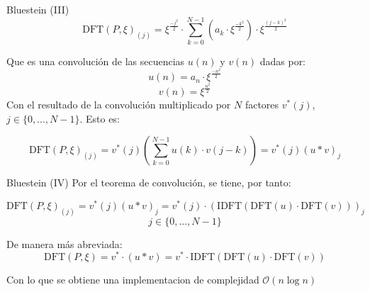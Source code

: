 \documentclass[spanish]{beamer}
\newcommand{\DFT}{\text{DFT}}
\newcommand{\IDFT}{\text{IDFT}}
\begin{document}
\begin{frame}{Bluestein (III)}
\begin{equation*}
      \DFT(P,\xi)_{(j)}= \xi ^{\frac{-j^2}{2}} \cdot \sum\limits_{k=0}^{N-1} (a_k \cdot\xi ^ {\frac{-k^2}{2}}) \cdot \xi^{ \frac{(j-k)^2}{2}}
\end{equation*}

Que es una convolución de las secuencias $u(n)$ y $v(n)$ dadas por:
\begin{equation*}
    u(n)= a_n \cdot\xi ^ {\frac{-n^2}{2}}
\end{equation*}
\begin{equation*}
    v(n) = \xi ^ { \frac{n^2}{2}}
\end{equation*}
Con el resultado de la convolución multiplicado por $N$ factores $v^{*}(j)$, $j\in\{0,...,N-1\}$. Esto es:

\begin{equation*}
      \DFT(P,\xi)_{(j)} =  v^{*}(j) \left(\sum\limits_{k=0}^{N-1} u(k) \cdot v(j-k)\right) =  v^{*}(j)(u * v)_j
\end{equation*}

\end{frame}
\begin{frame}{Bluestein (IV)}
    Por el teorema de convolución, se tiene, por tanto:
    
\begin{equation*}
    \DFT(P,\xi)_{(j)} =  v^{*}(j)(u * v)_j =   v^{*}(j) \cdot (\IDFT (\DFT(u) \cdot \DFT(v)))_j
\end{equation*}
\begin{equation*}
    j\in\{0,...,N-1\}
\end{equation*}

De manera más abreviada:
\begin{equation*}
    \DFT(P,\xi) =  v^{*} \cdot (u * v) =   v^{*} \cdot \IDFT (\DFT(u) \cdot \DFT(v))
\end{equation*}

Con lo que se obtiene una implementacion de complejidad $\mathcal{O}(n\log{}n)$
\end{frame}
\end{document}
